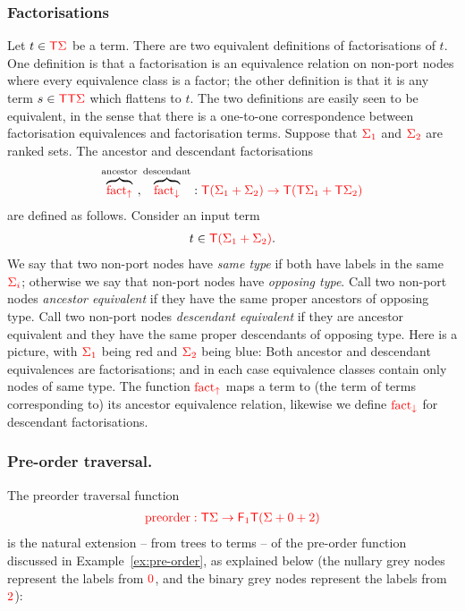 \subsubsection{Factorisations}
    Let $t \in {\color{red}{\mathsf T}} {\color{red}{\Sigma}}$ be a term. 
    There are two equivalent definitions of factorisations of $t$. One definition is that a factorisation is an equivalence relation on non-port nodes where every equivalence class is a factor; the other definition is that it is any term $s  \in {\color{red}{\mathsf T}} {\color{red}{\mathsf T}} {\color{red}{\Sigma}}$ which flattens to $t$. 
    The two definitions are easily seen to be equivalent, in the sense that there is a one-to-one correspondence between factorisation equivalences and factorisation terms.
    Suppose that ${\color{red}{\Sigma_1}}$ and ${\color{red}{\Sigma_2}}$ are ranked sets. The ancestor and descendant factorisations 
        \begin{align*}
            \overbrace{{\color{red}{\mathrm{fact_{\uparrow}}}}}^{\text{ancestor}}, \overbrace{{\color{red}{\mathrm{fact_{\downarrow}}}}}^{\text{descendant}}  : {\color{red}{{\color{red}{\mathsf T}}(\Sigma_1+\Sigma_2) \to {\color{red}{\mathsf T}}({\color{red}{\mathsf T}}\Sigma_1 + {\color{red}{\mathsf T}}\Sigma_2)}}
        \end{align*}
        are defined as follows. Consider an input term
        \begin{align*}
            t \in {\color{red}{{\color{red}{\mathsf T}}(\Sigma_1+\Sigma_2)}}.
        \end{align*}
        We say that two non-port nodes have \emph{same type} if both have labels in the same  ${\color{red}{\Sigma_i}}$; otherwise we say that non-port nodes have \emph{opposing type}.  Call two non-port nodes \emph{ancestor equivalent}  if they have the same proper ancestors of opposing type. Call two non-port nodes \emph{descendant equivalent}  if they  are ancestor equivalent and they have the same proper descendants of opposing type. Here is a picture, with ${\color{red}{\Sigma_1}}$ being red and ${\color{red}{\Sigma_2}}$ being blue: 
        Both ancestor and descendant equivalences are factorisations; and in each case equivalence classes contain only nodes of same type.  The function ${\color{red}{\mathrm{fact_{\uparrow}}}}$ maps a term to (the term of terms corresponding to) its ancestor equivalence relation, likewise we define ${\color{red}{\mathrm{fact_{\downarrow}}}}$ for  descendant factorisations.
    
        \subsubsection{Pre-order traversal.} The preorder traversal function  
        \begin{align*}
            {\color{red}{{\color{red}{\mathrm{preorder}}}: {\color{red}{\mathsf T}}\Sigma \to {\color{red}{\mathsf F_{1}}}{\color{red}{\mathsf T}}({\color{red}{\Sigma}}+ 0 + 2)}}
        \end{align*}
        is the natural extension -- from trees to terms -- of the  pre-order function discussed in Example~\ref{ex:pre-order}, as explained below (the nullary grey nodes represent the labels from ${\color{red}{0}}$, and the binary grey nodes represent the labels from ${\color{red}{2}}$):
        
